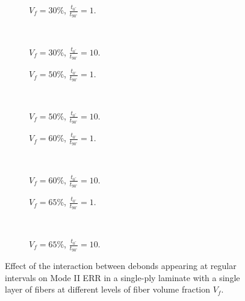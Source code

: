 \documentclass[review]{elsarticle}
\begin{document}
\begin{figure}[!h]
\centering
   \begin{subfigure}[b]{0.45\textwidth}
        \caption{$V_{f}=30\%$, $\frac{t_{0^{\circ}}}{t_{90^{\circ}}}=1$.}\label{subfig:sidefiber30MIIthick1}
    \end{subfigure} ~
    \begin{subfigure}[b]{0.45\textwidth}
         \caption{$V_{f}=30\%$, $\frac{t_{0^{\circ}}}{t_{90^{\circ}}}=10$.}\label{subfig:sidefiber30MIIthick10}
    \end{subfigure}

   \begin{subfigure}[b]{0.45\textwidth}
        \caption{$V_{f}=50\%$, $\frac{t_{0^{\circ}}}{t_{90^{\circ}}}=1$.}\label{subfig:sidefiber50MIIthick1}
    \end{subfigure} ~
    \begin{subfigure}[b]{0.45\textwidth}
         \caption{$V_{f}=50\%$, $\frac{t_{0^{\circ}}}{t_{90^{\circ}}}=10$.}\label{subfig:sidefiber50MIIthick10}
    \end{subfigure}

    \begin{subfigure}[b]{0.45\textwidth}
        \caption{$V_{f}=60\%$, $\frac{t_{0^{\circ}}}{t_{90^{\circ}}}=1$.}\label{subfig:sidefiber60MIIthick1}
    \end{subfigure} ~
    \begin{subfigure}[b]{0.45\textwidth}
        \caption{$V_{f}=60\%$, $\frac{t_{0^{\circ}}}{t_{90^{\circ}}}=10$.}\label{subfig:sidefiber60MIIthick10}
    \end{subfigure}

    \begin{subfigure}[b]{0.45\textwidth}
        \caption{$V_{f}=65\%$, $\frac{t_{0^{\circ}}}{t_{90^{\circ}}}=1$.}\label{subfig:sidefiber65MIIthick1}
    \end{subfigure} ~
    \begin{subfigure}[b]{0.45\textwidth}
        \caption{$V_{f}=65\%$, $\frac{t_{0^{\circ}}}{t_{90^{\circ}}}=10$.}\label{subfig:sidefiber65MIIthick10}
    \end{subfigure}

\caption{Effect of the interaction between debonds appearing at regular intervals on Mode II ERR in a single-ply laminate with a single layer of fibers at different levels of fiber volume fraction $V_{f}$.}\label{fig:sidefibersMII}
\end{figure}
\end{document}
